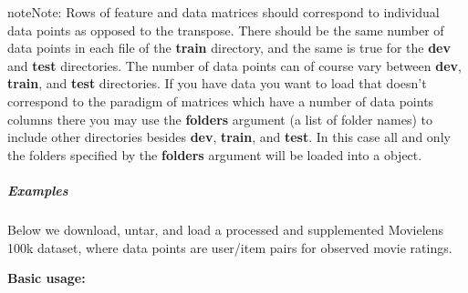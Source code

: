 \documentclass[letterpaper,10pt,english]{sphinxmanual}
\begin{document}
\begin{notice}{note}{Note:}
Rows of feature and data matrices should correspond to individual data points as opposed to the transpose.
There should be the same number of data points in each file of the \textbf{train} directory, and the same is true for
the \textbf{dev} and \textbf{test} directories. The number of data points can of course vary between \textbf{dev}, \textbf{train}, and \textbf{test} directories.
If you have data you want to load that doesn't correspond to the paradigm of matrices which have a number of data points columns there you may use the {\hyperref[loader:loader.read_data_sets]{\emph{}}} \textbf{folders} argument (a list of folder names) to include other directories besides \textbf{dev}, \textbf{train}, and \textbf{test}. In this case all and only the folders specified by the \textbf{folders} argument will be loaded into a {\hyperref[loader:loader.DataSets]{\emph{}}} object.
\end{notice}


\subparagraph{Examples}
\label{loader_tutorial:examples}
Below we download, untar, and load a processed and supplemented Movielens 100k dataset, where data points are user/item pairs
for observed movie ratings.

\textbf{Basic usage:}
\end{document}
